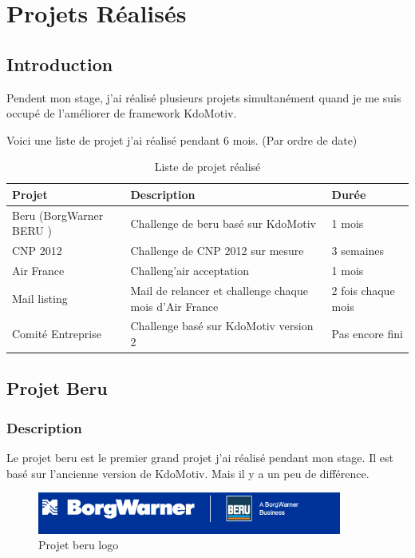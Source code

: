  
	
\newpage
\section{Projets Réalisés}
\subsection{Introduction}
Pendent mon stage,  j'ai réalisé plusieurs projets simultanément quand je me suis occupé de l'améliorer de framework KdoMotiv.

Voici une liste de projet j'ai réalisé pendant 6 mois. (Par ordre de date)

\begin{table}[htbp]
\centering
\renewcommand{\tabularxcolumn}[1]{>{\arraybackslash}m{#1}}
\begin{tabularx}{\textwidth}{lXl}
  \toprule
  Projet & Description  & Durée  \\
  \midrule
	 Beru (BorgWarner BERU )& Challenge de beru basé sur KdoMotiv & 1 mois \\ 	 
	 \hline	 
	 CNP 2012 & Challenge de CNP 2012 sur mesure & 3 semaines \\ 	 
	 \hline
	 Air France & Challeng'air acceptation & 1 mois \\ 
	 \hline
	 Mail listing & Mail de relancer et challenge chaque mois d'Air France & 2 fois chaque mois\\
	 \hline
	 Comité Entreprise & Challenge basé sur KdoMotiv version 2 & Pas encore fini \\
  \bottomrule
\end{tabularx}
 \caption{Liste de projet réalisé }
\end{table}

\subsection{Projet Beru}

\subsubsection{Description}
Le projet beru est le premier grand projet j'ai réalisé pendant mon stage. Il est basé sur l'ancienne version de KdoMotiv. Mais il y a un peu de différence.

\begin{figure}[hbtp]
\centering
\includegraphics[width=10cm]{body/images/projet-beru.png}
\caption{Projet beru logo}
\end{figure}

